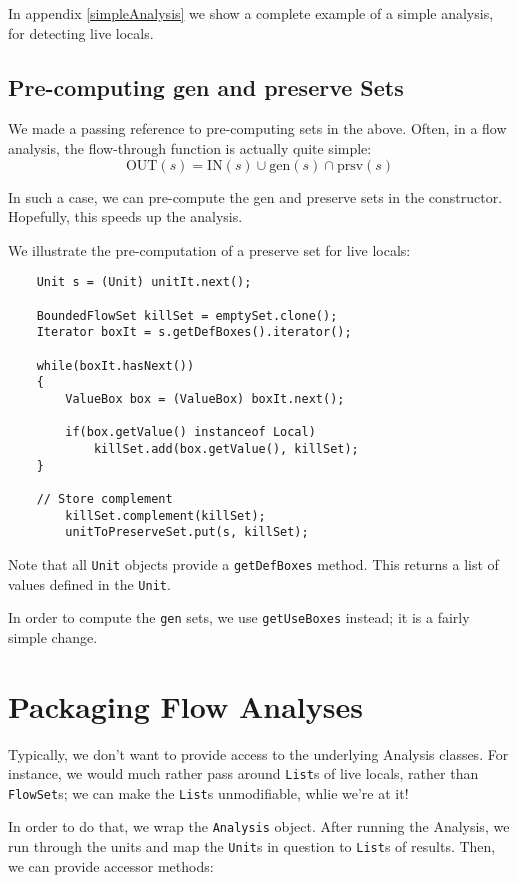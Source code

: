 \documentclass{article}
\begin{document}
In appendix \ref{simpleAnalysis} we show a complete example of a simple
analysis, for detecting live locals.

\subsection{Pre-computing gen and preserve Sets}

We made a passing reference to pre-computing sets in the above.
Often, in a flow analysis, the flow-through function is actually quite
simple:
\[\mbox{OUT}(s) = \mbox{IN}(s) \cup \mbox{gen}(s) \cap \mbox{prsv}(s) \]

In such a case, we can pre-compute the gen and preserve sets in the
constructor.  Hopefully, this speeds up the analysis.

We illustrate the pre-computation of a preserve set for live locals:

\begin{verbatim}
    Unit s = (Unit) unitIt.next();

    BoundedFlowSet killSet = emptySet.clone();
    Iterator boxIt = s.getDefBoxes().iterator();

    while(boxIt.hasNext())
    {
        ValueBox box = (ValueBox) boxIt.next();

        if(box.getValue() instanceof Local)
            killSet.add(box.getValue(), killSet);
    }

    // Store complement
        killSet.complement(killSet);
        unitToPreserveSet.put(s, killSet);
\end{verbatim}

Note that all {\tt Unit} objects provide a {\tt getDefBoxes} 
method.  This returns a list of values defined in the {\tt Unit}.

In order to compute the {\tt gen} sets, we use {\tt getUseBoxes} instead;
it is a fairly simple change.

\section{Packaging Flow Analyses}

Typically, we don't want to provide access to the underlying Analysis
classes.  For instance, we would much rather pass around {\tt List}s of
live locals, rather than {\tt FlowSet}s; we can make the {\tt List}s
unmodifiable, whlie we're at it!

In order to do that, we wrap the {\tt Analysis} object.  After running the
Analysis, we run through the units and map the {\tt Unit}s in question
to {\tt List}s of results.  Then, we can provide accessor methods:
\end{document}
